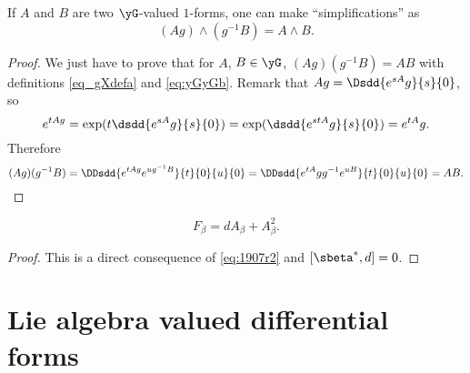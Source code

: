 \begin{lemma}
	If $A$ and $B$ are two $\yG$-valued $1$-forms, one can make  ``simplifications'' as
	\begin{equation}
		(Ag)\wedge(g^{-1} B)=A\wedge B.
	\end{equation}
	\label{lem:simplif}
\end{lemma}

\begin{proof}
	We just have to prove that for $A$, $B\in\yG$, $(Ag)(g^{-1} B)=AB$ with definitions \eqref{eq_gXdefa} and \eqref{eq:yGyGb}. Remark that $Ag=\Dsdd{e^{sA}g}{s}{0}$, so
	\[
		e^{tAg}=\exp(t\dsdd{e^{sA}g}{s}{0})=\exp(\dsdd{e^{stA}g}{s}{0})=e^{tA}g.
	\]
	Therefore
	\[
		(Ag)(g^{-1} B)=\DDsdd{  e^{tAg}e^{ug^{-1} B}  }{t}{0}{u}{0}=\DDsdd{  e^{tA}gg^{-1} e^{uB}  }{t}{0}{u}{0}=AB.
	\]
\end{proof}

\begin{lemma}
	\begin{equation}
		F_{\beta}=dA_{\beta}+A_{\beta}^2.
	\end{equation}
\end{lemma}

\begin{proof}
	This is  a direct consequence of \eqref{eq:1907r2} and $[\sbeta^*,d]=0$.
\end{proof}

\section{Lie algebra valued differential forms}	\label{SecLiaAlgformval}

